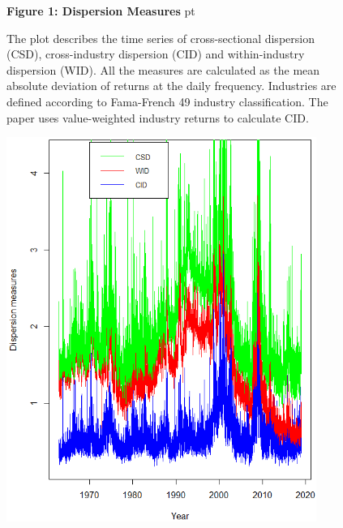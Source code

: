 \documentclass[12pt]{article}
\begin{document}
\begin{figure}[h!]
\textbf{Figure 1: Dispersion Measures}
 pt
\begin{flushleft}
{The plot describes the time series of cross-sectional dispersion (CSD), cross-industry dispersion (CID) and within-industry dispersion (WID). All the measures are calculated as the mean absolute deviation of returns at the daily frequency. Industries are defined according to Fama-French 49 industry classification. The paper uses value-weighted industry returns to calculate CID.}
\end{flushleft}
\centering
\includegraphics[width=0.9\textwidth]{fig1.png}
\end{figure}
\end{document}
